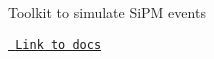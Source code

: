 Toolkit to simulate Si\+PM events

\href{https://edopro98.github.io/pySiPM/docs/build/latex/doc.pdf}{\texttt{ Link to docs}} 